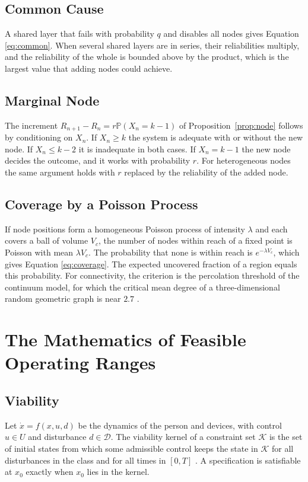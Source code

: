 \documentclass[11pt,openany]{book}
\theoremstyle{definition}
\theoremstyle{remark}
\renewcommand{\Pr}{\mathbb{P}}
\newcommand{\Kset}{\mathcal{K}}
\newcommand{\Dset}{\mathcal{D}}
\begin{document}
\section{Common Cause}

A shared layer that fails with probability $q$ and disables all nodes gives Equation \eqref{eq:common}. When several shared layers are in series, their reliabilities multiply, and the reliability of the whole is bounded above by the product, which is the largest value that adding nodes could achieve.

\section{Marginal Node}

The increment $R_{n+1}-R_n=r\Pr(X_n=k-1)$ of Proposition~\ref{prop:node} follows by conditioning on $X_n$. If $X_n\ge k$ the system is adequate with or without the new node. If $X_n\le k-2$ it is inadequate in both cases. If $X_n=k-1$ the new node decides the outcome, and it works with probability $r$. For heterogeneous nodes the same argument holds with $r$ replaced by the reliability of the added node.

\section{Coverage by a Poisson Process}

If node positions form a homogeneous Poisson process of intensity $\lambda$ and each covers a ball of volume $V_c$, the number of nodes within reach of a fixed point is Poisson with mean $\lambda V_c$. The probability that none is within reach is $e^{-\lambda V_c}$, which gives Equation \eqref{eq:coverage}. The expected uncovered fraction of a region equals this probability. For connectivity, the criterion is the percolation threshold of the continuum model, for which the critical mean degree of a three-dimensional random geometric graph is near $2.7$ \cite{torquato2002}.

\chapter{The Mathematics of Feasible Operating Ranges}
\label{app:range}

\section{Viability}

Let $\dot x=f(x,u,d)$ be the dynamics of the person and devices, with control $u\in U$ and disturbance $d\in\Dset$. The viability kernel of a constraint set $\Kset$ is the set of initial states from which some admissible control keeps the state in $\Kset$ for all disturbances in the class and for all times in $[0,T]$ \cite{aubin1991}. A specification is satisfiable at $x_0$ exactly when $x_0$ lies in the kernel.
\end{document}

